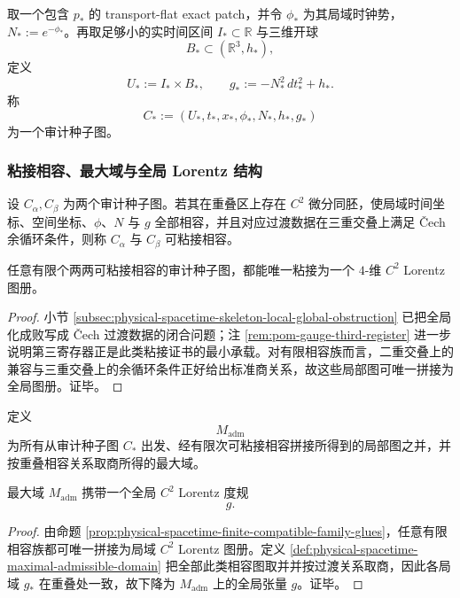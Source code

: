 \begin{definition}[审计种子图]\label{def:physical-spacetime-seed-chart}
取一个包含 \(p_\ast\) 的 transport-flat exact patch，并令 \(\phi_\ast\) 为其局域时钟势，\(N_\ast:=e^{-\phi_\ast}\)。再取足够小的实时间区间 \(I_\ast\subset\mathbb R\) 与三维开球
\[
B_\ast\subset(\mathbb R^3,h_\ast),
\]
定义
\[
U_\ast:=I_\ast\times B_\ast,
\qquad
g_\ast:=-N_\ast^2\,dt_\ast^2+h_\ast.
\]
称
\[
C_\ast:=(U_\ast,t_\ast,x_\ast,\phi_\ast,N_\ast,h_\ast,g_\ast)
\]
为一个审计种子图。
\end{definition}

\subsubsection{粘接相容、最大域与全局 Lorentz 结构}

\begin{definition}[可粘接相容]\label{def:physical-spacetime-gluing-compatibility}
设 \(C_\alpha,C_\beta\) 为两个审计种子图。若其在重叠区上存在 \(C^2\) 微分同胚，使局域时间坐标、空间坐标、\(\phi\)、\(N\) 与 \(g\) 全部相容，并且对应过渡数据在三重交叠上满足 \v{C}ech 余循环条件，则称 \(C_\alpha\) 与 \(C_\beta\) 可粘接相容。
\end{definition}

\begin{proposition}[有限相容族的粘接]\label{prop:physical-spacetime-finite-compatible-family-glues}
任意有限个两两可粘接相容的审计种子图，都能唯一粘接为一个 \(4\)-维 \(C^2\) Lorentz 图册。
\end{proposition}
\begin{proof}
小节 \ref{subsec:physical-spacetime-skeleton-local-global-obstruction} 已把全局化成败写成 \v{C}ech 过渡数据的闭合问题；注 \ref{rem:pom-gauge-third-register} 进一步说明第三寄存器正是此类粘接证书的最小承载。对有限相容族而言，二重交叠上的兼容与三重交叠上的余循环条件正好给出标准商关系，故这些局部图可唯一拼接为全局图册。证毕。
\end{proof}

\begin{definition}\label{def:physical-spacetime-maximal-admissible-domain}
定义
\[
M_{\mathrm{adm}}
\]
为所有从审计种子图 \(C_\ast\) 出发、经有限次可粘接相容拼接所得到的局部图之并，并按重叠相容关系取商所得的最大域。
\end{definition}

\begin{theorem}[全局 Lorentz 结构]\label{thm:physical-spacetime-global-lorentz-structure}
最大域 \(M_{\mathrm{adm}}\) 携带一个全局 \(C^2\) Lorentz 度规
\[
g.
\]
\end{theorem}
\begin{proof}
由命题 \ref{prop:physical-spacetime-finite-compatible-family-glues}，任意有限相容族都可唯一拼接为局域 \(C^2\) Lorentz 图册。定义 \ref{def:physical-spacetime-maximal-admissible-domain} 把全部此类相容图取并并按过渡关系取商，因此各局域 \(g_\ast\) 在重叠处一致，故下降为 \(M_{\mathrm{adm}}\) 上的全局张量 \(g\)。证毕。
\end{proof}

